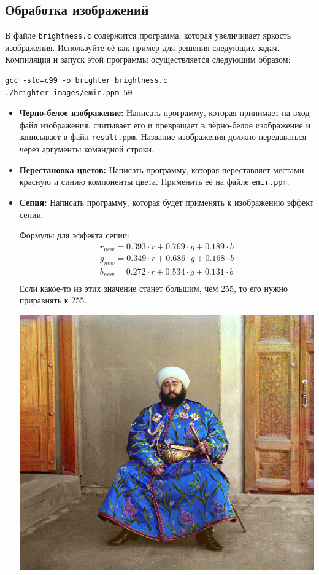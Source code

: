 \documentclass{article}
\begin{document}
\subsection*{Обработка изображений}
В файле \texttt{brightness.c} содержится программа, которая увеличивает яркость изображения. Используйте её как пример для решения следующих задач. Компиляция и запуск этой программы осуществляется следующим образом:
\begin{verbatim}
gcc -std=c99 -o brighter brightness.c
./brighter images/emir.ppm 50
\end{verbatim}
\begin{itemize}
\item \textbf{Черно-белое изображение:} Написать программу, которая принимает на вход файл изображения, считывает его и превращает в чёрно-белое изображение и записывает в файл \texttt{result.ppm}. Название изображения должно передаваться через аргументы командной строки.
\item \textbf{Перестановка цветов:} Написать программу, которая переставляет местами красную и синию компоненты цвета. Применить её на файле \texttt{emir.ppm}.
\item \textbf{Сепия:} Написать программу, которая будет применять к изображению эффект сепии.
\begin{multicols}{3}
Формулы для эффекта сепии:
\begin{align*}
r_{new} = 0.393 \cdot r + 0.769 \cdot g + 0.189 \cdot b\\
g_{new} = 0.349 \cdot r + 0.686 \cdot g + 0.168 \cdot b\\
b_{new} = 0.272 \cdot r + 0.534 \cdot g + 0.131 \cdot b\\
\end{align*}
Если какое-то из этих значение станет большим, чем $255$, то его нужно приравнять к $255$.
\vfill			
\begin{center}
\includegraphics[scale=0.26]{../images/imageproc.jpg}

\end{center}
\end{multicols}
\end{itemize}
\end{document}
